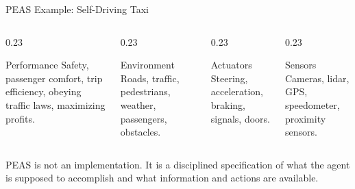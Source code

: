 \documentclass[aspectratio=169,10pt]{beamer}
\begin{document}
\begin{frame}{PEAS Example: Self-Driving Taxi}
  \begin{columns}[T,onlytextwidth]
    \begin{column}{0.23\textwidth}
      \begin{block}{Performance}
        Safety, passenger comfort, trip efficiency, obeying traffic laws, maximizing profits.
      \end{block}
    \end{column}
    \begin{column}{0.23\textwidth}
      \begin{block}{Environment}
        Roads, traffic, pedestrians, weather, passengers, obstacles.
      \end{block}
    \end{column}
    \begin{column}{0.23\textwidth}
      \begin{block}{Actuators}
        Steering, acceleration, braking, signals, doors.
      \end{block}
    \end{column}
    \begin{column}{0.23\textwidth}
      \begin{block}{Sensors}
        Cameras, lidar, GPS, speedometer, proximity sensors.
      \end{block}
    \end{column}
  \end{columns}
  \vspace{0.10in}
  \begin{keyidea}
    PEAS is not an implementation. It is a disciplined specification of what the agent is supposed to accomplish and what information and actions are available.
  \end{keyidea}
\end{frame}
\end{document}
